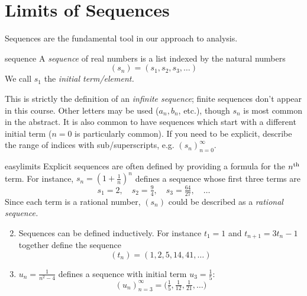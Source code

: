 \graphicspath{{2limits/asy/}}


\section{Limits of Sequences}

Sequences are the fundamental tool in our approach to analysis.

\begin{defn}{}{sequence}
A \emph{sequence} of real numbers is a list indexed by the natural numbers
\[(s_n)=(s_1,s_2,s_3,\ldots)\]
We call $s_1$ the \emph{initial term/element.}
\end{defn}

This is strictly the definition of an \emph{infinite sequence}; finite sequences don't appear in this course. Other letters may be used ($a_n,b_n$, etc.), though $s_n$ is most common in the abstract. It is also common to have sequences which start with a different initial term ($n=0$ is particularly common). If you need to be explicit, describe the range of indices with sub/superscripts, e.g.{} $(s_n)_{n=0}^\infty$.


\begin{examples}{}{easylimits}
	\exstart Explicit sequences are often defined by providing a formula for the $n\textsuperscript{th}$ term. For instance, $s_n=\left(1+\frac 1n\right)^n$ defines a sequence whose first three terms are
	\[s_1=2,\quad s_2=\tfrac 94,\quad s_3=\tfrac{64}{27},\quad\ldots\]
	Since each term is a rational number, $(s_n)$ could be described as a \emph{rational sequence.}
	\begin{enumerate}\setcounter{enumi}{1}
	  \item\label{ex:easylimits2} Sequences can be defined inductively. For instance $t_1=1$ and $t_{n+1}=3t_n-1$ together define the sequence
	  \[(t_n)=(1,2,5,14,41,\ldots)\]
	  \item $u_n=\frac 1{n^2-4}$ defines a sequence with initial term $u_3=\frac 15$:
	  \[(u_n)_{n=3}^\infty =\bigl(\tfrac 15,\tfrac 1{12},\tfrac 1{21},\ldots\bigr)\]
	\end{enumerate}
\end{examples}



